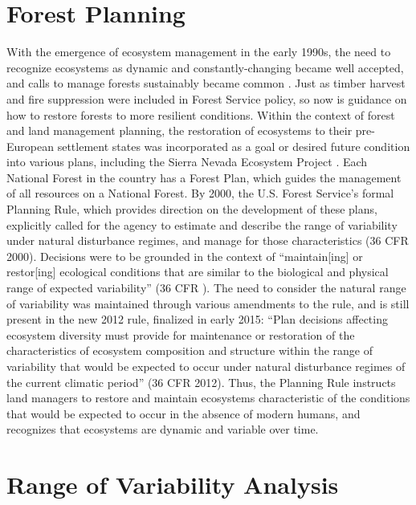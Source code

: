 
\section{Forest Planning}

With the emergence of ecosystem management in the early 1990s, the need to recognize ecosystems as dynamic and constantly-changing became well accepted, and calls to manage forests sustainably became common \citep{Christensen1996}. Just as timber harvest and fire suppression were included in Forest Service policy, so now is guidance on how to restore forests to more resilient conditions. Within the context of forest and land management planning, the restoration of ecosystems to their pre-European settlement states was incorporated as a goal or desired future condition into various plans, including the Sierra Nevada Ecosystem Project \cite{SNEP1996a}. Each National Forest in the country has a Forest Plan, which guides the management of all resources on a National Forest. By 2000, the U.S. Forest Service's formal Planning Rule, which provides direction on the development of these plans, explicitly called for the agency to estimate and describe the range of variability under natural disturbance regimes, and manage for those characteristics (36 CFR  2000). Decisions were to be grounded in the context of ``maintain[ing] or restor[ing] ecological conditions that are similar to the biological and physical range of expected variability'' (36 CFR ). The need to consider the natural range of variability was maintained through various amendments to the rule, and is still present in the new 2012 rule, finalized in early 2015: ``Plan decisions affecting ecosystem diversity must provide for maintenance or restoration of the characteristics of ecosystem composition and structure within the range of variability that would be expected to occur under natural disturbance regimes of the current climatic period'' (36 CFR  2012). Thus, the Planning Rule instructs land managers to restore and maintain ecosystems characteristic of the conditions that would be expected to occur in the absence of modern humans, and recognizes that ecosystems are dynamic and variable over time.





\section{Range of Variability Analysis}

